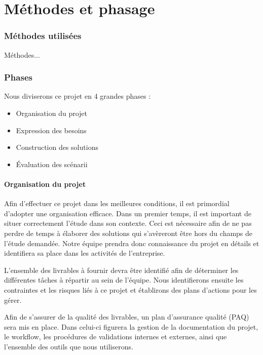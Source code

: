 \chapter*{M\'ethodes et phasage}

\subsection*{M\'ethodes utilis\'ees}

M\'ethodes...

\subsection*{Phases}

Nous diviserons ce projet en 4 grandes phases :


\begin{itemize}
 \item Organisation du projet
 \item Expression des besoins
 \item Construction des solutions
 \item \'Evaluation des sc\'enarii
\end{itemize}


\subsubsection*{Organisation du projet}

Afin d'effectuer ce projet dans les meilleures conditions, il est primordial d'adopter une organisation efficace.
Dans un premier temps, il est important de situer correctement l'\'etude dans son contexte. 
Ceci est n\'ecessaire afin de ne pas perdre de temps \`a \'elaborer des solutions qui s'av\`ereront \^etre hors du champs de l'\'etude demand\'ee.
Notre \'equipe prendra donc connaissance du projet en détails et identifiera sa place dans les activit\'es de l'entreprise.

L'ensemble des livrables \`a fournir devra \^etre identifi\'e afin de d\'eterminer les diff\'erentes t\^aches \`a r\'epartir au sein de l'\'equipe.
Nous identifierons ensuite les contraintes et les risques li\'es \`a ce projet et \'etablirons des plans d'actions pour les g\'erer.

Afin de s'assurer de la qualit\'e des livrables, un plan d'assurance qualit\'e (PAQ) sera mis en place. Dans celui-ci figurera la gestion de la documentation du projet,
le workflow, les proc\'edures de validations internes et externes, ainsi que l'ensemble des outils que nous utiliserons.

